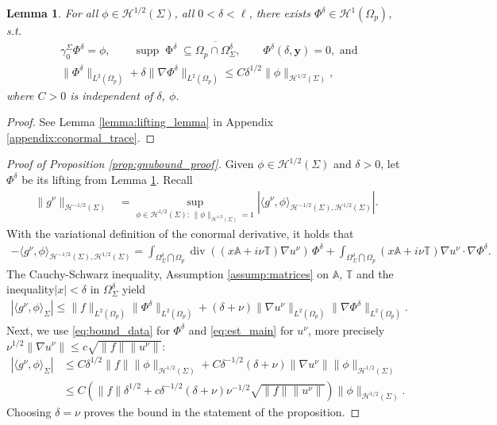 \documentclass[report]{elsarticle}
\newtheorem{lemma}[theorem]{Lemma}
\numberwithin{theorem}{section}
\renewcommand{\H}{\mathcal{H}}
\renewcommand{\vec}[1]{\mathbf{#1}}
\begin{document}
\begin{lemma}
	\label{lemma:lifting}
	For all $\phi\in \mathcal{H}^{1/2}(\Sigma)$, all $0<\delta<\ell$, there exists $\Phi^{\delta}\in \mathcal{H}^1(\Omega_p)$, s.t. 
	\begin{align}
		\nonumber
		&\gamma_0^{\Sigma}\Phi^{\delta}=\phi,\qquad 
		\operatorname{supp}\operatorname{\Phi}^{\delta}\subseteq \overline{\Omega_p\cap\Omega^{\delta}_{\Sigma}}, \qquad \Phi^{\delta}(\delta,\vec{y})=0,	\text{ and }\\
		\label{eq:bound_data}
		&\|\Phi^{\delta}\|_{L^2(\Omega_p)}+\delta \|\nabla \Phi^{\delta}\|_{L^2(\Omega_p)}\leq C \delta^{1/2}\|\phi\|_{\mathcal{H}^{1/2}(\Sigma)}, \quad 
	\end{align}
	where $C>0$ is independent of $\delta$, $\phi$.
\end{lemma}
\begin{proof}
	See Lemma \ref{lemma:lifting_lemma} in Appendix  \ref{appendix:conormal_trace}.
\end{proof}
\begin{proof}[Proof of Proposition \ref{prop:gnubound_proof}]
	Given $\phi\in \H^{1/2}(\Sigma)$ and $\delta>0$, let $\Phi^{\delta}$ be its lifting from Lemma \ref{lemma:lifting}. Recall 
	\begin{align*}
		\|g^{\nu}\|_{\H^{-1/2}(\Sigma)}&=\sup\limits_{\phi\in \H^{1/2}(\Sigma): \, \|\phi\|_{\mathcal{H}^{1/2}(\Sigma)}=1}\left|\langle g^{\nu}, \phi\rangle_{\H^{-1/2}(\Sigma), \H^{1/2}(\Sigma)}\right|. 
	\end{align*}
	With the variational definition of the conormal derivative, it holds that 
	\begin{align*}
		-\langle g^{\nu}, \phi\rangle_{\H^{-1/2}(\Sigma), \H^{1/2}(\Sigma)}=\int_{\Omega_{\Sigma}^{\delta}\bigcap\Omega_p}\operatorname{div}\left(( x \mathbb{A}+i\nu\mathbb{T})\nabla u^{\nu}\right)\, {\Phi^{\delta}}+\int_{\Omega_{\Sigma}^{\delta}\bigcap\Omega_p}( x \mathbb{A}+i\nu\mathbb{T})\nabla u^{\nu}\cdot \nabla{\Phi}^{\delta}.
	\end{align*}
	The Cauchy-Schwarz inequality, Assumption  \ref{assump:matrices} on $\mathbb{A}$, $\mathbb{T}$ and the inequality$| x |<\delta$ in $\Omega_{\Sigma}^{\delta}$ yield
	\begin{align*}
		|\langle g^{\nu},\phi\rangle_{\Sigma}|\leq 
		\|f\|_{L^2(\Omega_p)}\|\Phi^{\delta}\|_{L^2(\Omega_p)}+(\delta+\nu)\|\nabla u^{\nu}\|_{L^2(\Omega_p)}\|\nabla \Phi^{\delta}\|_{L^2(\Omega_p)}. 
	\end{align*}
	Next, we use \eqref{eq:bound_data} for $\Phi^{\delta}$ and \eqref{eq:est_main} for $u^{\nu}$, more precisely $\nu^{1/2}\|\nabla u^{\nu}\|\leq c  \sqrt{\|f\|\|u^{\nu}\|}$:
	\begin{align*}
		|\langle g^{\nu},\phi\rangle_{\Sigma}|&\leq C		 \delta^{1/2}\|f\|\|\phi\|_{\mathcal{H}^{1/2}(\Sigma)}+C\delta^{-1/2}(\delta+\nu)\|\nabla u^{\nu}\|\|\phi\|_{\mathcal{H}^{1/2}(\Sigma)}\\
		&\leq C\left( \|f\|\delta^{1/2}+c\delta^{-1/2}(\delta+\nu)\nu^{-1/2}\sqrt{\|f\|\|u^{\nu}\|}\right)\|\phi\|_{\mathcal{H}^{1/2}(\Sigma)}.
	\end{align*}
	Choosing $\delta=\nu$ proves the bound in the statement of the proposition.
\end{proof}
\end{document}
